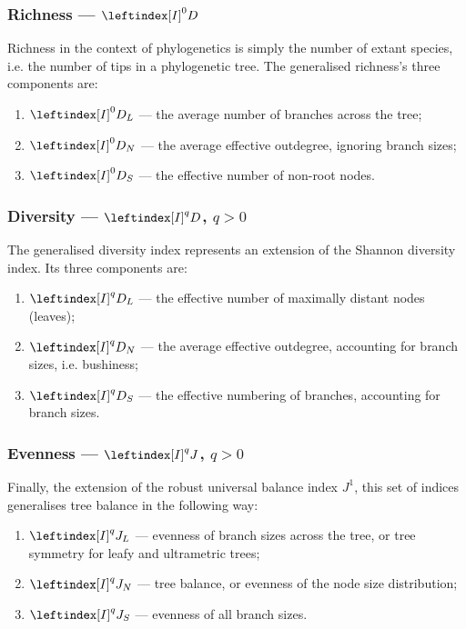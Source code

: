 \subsubsection{Richness --- $\leftindex[I]^0{D}$}
Richness in the context of phylogenetics is simply the number of extant species,
i.e. the number of tips in a phylogenetic tree. The generalised richness's
three components are:

\begin{enumerate}
    \item $\leftindex[I]^0{D}_L$ --- the average number of branches across the
        tree;
    \item $\leftindex[I]^0{D}_N$ --- the average effective outdegree, ignoring
        branch sizes;
    \item $\leftindex[I]^0{D}_S$ --- the
        effective number of non-root nodes.
\end{enumerate}

\subsubsection{Diversity --- $\leftindex[I]^q{D}$, $q>0$}
The generalised diversity index represents an extension of the Shannon diversity
index. Its three components are:

\begin{enumerate}
    \item $\leftindex[I]^q{D}_L$ --- the effective number of maximally distant
        nodes (leaves);
    \item $\leftindex[I]^q{D}_N$ --- the average effective outdegree, accounting
        for branch sizes, i.e. bushiness;
    \item $\leftindex[I]^q{D}_S$ --- the effective numbering of branches,
        accounting for branch sizes.
\end{enumerate}

\subsubsection{Evenness --- $\leftindex[I]^q{J}$, $q>0$}
Finally, the extension of the robust universal balance index $J^1$, this set of
indices generalises tree balance in the following way:

\begin{enumerate}
    \item $\leftindex[I]^q{J}_L$ --- evenness of branch sizes across the tree,
        or tree symmetry for leafy and ultrametric trees;
    \item $\leftindex[I]^q{J}_N$ --- tree balance, or evenness of the node size
        distribution;
    \item $\leftindex[I]^q{J}_S$ --- evenness of all branch sizes.
\end{enumerate}



